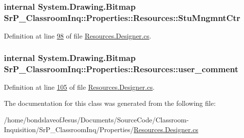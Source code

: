 \hypertarget{class_sr_p___classroom_inq_1_1_properties_1_1_resources_a8936df34fac714793207e165f0e1abb3}{
\subsubsection[{\-Stu\-Mngmnt\-Ctr}]{\setlength{\rightskip}{0pt plus 5cm}internal \-System.\-Drawing.\-Bitmap \-Sr\-P\-\_\-\-Classroom\-Inq\-::\-Properties\-::\-Resources\-::\-Stu\-Mngmnt\-Ctr}}
\label{class_sr_p___classroom_inq_1_1_properties_1_1_resources_a8936df34fac714793207e165f0e1abb3}


\-Definition at line \hyperlink{_resources_8_designer_8cs_source_l00098}{98} of file \hyperlink{_resources_8_designer_8cs_source}{\-Resources.\-Designer.\-cs}.

\hypertarget{class_sr_p___classroom_inq_1_1_properties_1_1_resources_a640888878348ec44e2974837abb13f97}{
\subsubsection[{user\-\_\-comment}]{\setlength{\rightskip}{0pt plus 5cm}internal \-System.\-Drawing.\-Bitmap \-Sr\-P\-\_\-\-Classroom\-Inq\-::\-Properties\-::\-Resources\-::user\-\_\-comment}}
\label{class_sr_p___classroom_inq_1_1_properties_1_1_resources_a640888878348ec44e2974837abb13f97}


\-Definition at line \hyperlink{_resources_8_designer_8cs_source_l00105}{105} of file \hyperlink{_resources_8_designer_8cs_source}{\-Resources.\-Designer.\-cs}.



\-The documentation for this class was generated from the following file\-:\begin{DoxyCompactItemize}
\item 
/home/bondslaveof\-Jesus/\-Documents/\-Source\-Code/\-Classroom-\/\-Inquisition/\-Sr\-P\-\_\-\-Classroom\-Inq/\-Properties/\hyperlink{_resources_8_designer_8cs}{\-Resources.\-Designer.\-cs}\end{DoxyCompactItemize}

